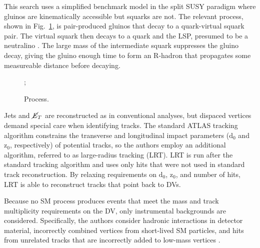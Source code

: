 \documentclass[12pt]{article}
\begin{document}
        This search uses a simplified benchmark model in the split SUSY paradigm where gluinos are kinematically accessible but squarks are not. The relevant process, shown in Fig.~\ref{displaced_process}, is pair-produced gluinos that decay to a quark-virtual squark pair. The virtual squark then decays to a quark and the LSP, presumed to be a neutralino . The large mass of the intermediate squark suppresses the gluino decay, giving the gluino enough time to form an R-hadron that propagates some measureable distance before decaying. 

        \noindent \begin{figure}[htbp] \begin{center}
        ;
        \caption{Process.}
        \label{displaced_process}
        \end{center} \end{figure}

        Jets and $\cancel{\it{E}}_{T}$ are reconstructed as in conventional analyses, but dispaced vertices demand special care when identifying tracks. The standard ATLAS tracking algorithm constrains the transverse and longitudinal impact parameters ($\mathrm{d}_0$ and $\mathrm{z}_0$, respectively) of potential tracks, so the authors employ an additional algorithm, referred to as large-radius tracking (LRT). LRT is run after the standard tracking algorithm and uses only hits that were not used in standard track reconstruction. By relaxing requirements on $\mathrm{d}_0$, $\mathrm{z}_0$, and number of hits, LRT is able to reconstruct tracks that point back to DVs.
        
        Because no SM process produces events that meet the mass and track multiplicity requirements on the DV, only instrumental backgrounds are considered. Specifically, the authors consider hadronic interactions in detector material, incorrectly combined vertices from short-lived SM particles, and hits from unrelated tracks that are incorrectly added to low-mass vertices .
\end{document}
